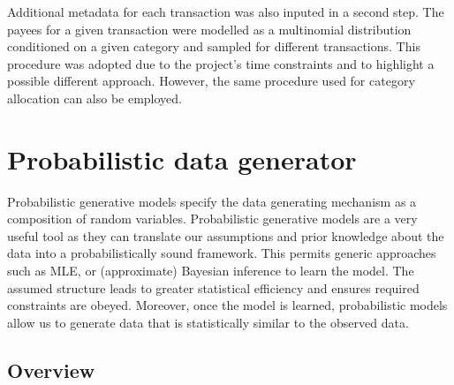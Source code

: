 \documentclass[]{article}
\begin{document}
Additional metadata for each transaction was also inputed in a second
step. The payees for a given transaction were modelled as a multinomial
distribution conditioned on a given category and sampled for different
transactions. This procedure was adopted due to the project's time
constraints and to highlight a possible different approach. However, the
same procedure used for category allocation can also be employed.

\section{Probabilistic data
generator}\label{probabilistic-data-generator}

Probabilistic generative models specify the data generating mechanism as
a composition of random variables. Probabilistic generative models are a
very useful tool as they can translate our assumptions and prior
knowledge about the data into a probabilistically sound framework. This
permits generic approaches such as MLE, or (approximate) Bayesian
inference to learn the model. The assumed structure leads to greater
statistical efficiency and ensures required constraints are obeyed.
Moreover, once the model is learned, probabilistic models allow us to
generate data that is statistically similar to the observed data.

\subsection*{Overview}
\end{document}
